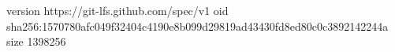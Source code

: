 version https://git-lfs.github.com/spec/v1
oid sha256:1570780afc049f32404c4190e8b099d29819ad43430fd8ed80c0c3892142244a
size 1398256
